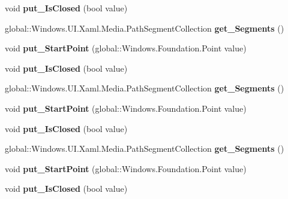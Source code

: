 \begin{DoxyCompactItemize}
void {\bfseries put\+\_\+\+Is\+Closed} (bool value)
\item 
\mbox{\label{interface_windows_1_1_u_i_1_1_xaml_1_1_media_1_1_i_path_figure_aaa95457239556a512efb7bb7df39b204}} 
global\+::\+Windows.\+U\+I.\+Xaml.\+Media.\+Path\+Segment\+Collection {\bfseries get\+\_\+\+Segments} ()
\item 
\mbox{\label{interface_windows_1_1_u_i_1_1_xaml_1_1_media_1_1_i_path_figure_a86e0b397f824468c4b41759cb0b0e209}} 
void {\bfseries put\+\_\+\+Start\+Point} (global\+::\+Windows.\+Foundation.\+Point value)
\item 
\mbox{\label{interface_windows_1_1_u_i_1_1_xaml_1_1_media_1_1_i_path_figure_a2a7fff536acc439d89e076c7b412848f}} 
void {\bfseries put\+\_\+\+Is\+Closed} (bool value)
\item 
\mbox{\label{interface_windows_1_1_u_i_1_1_xaml_1_1_media_1_1_i_path_figure_aaa95457239556a512efb7bb7df39b204}} 
global\+::\+Windows.\+U\+I.\+Xaml.\+Media.\+Path\+Segment\+Collection {\bfseries get\+\_\+\+Segments} ()
\item 
\mbox{\label{interface_windows_1_1_u_i_1_1_xaml_1_1_media_1_1_i_path_figure_a86e0b397f824468c4b41759cb0b0e209}} 
void {\bfseries put\+\_\+\+Start\+Point} (global\+::\+Windows.\+Foundation.\+Point value)
\item 
\mbox{\label{interface_windows_1_1_u_i_1_1_xaml_1_1_media_1_1_i_path_figure_a2a7fff536acc439d89e076c7b412848f}} 
void {\bfseries put\+\_\+\+Is\+Closed} (bool value)
\item 
\mbox{\label{interface_windows_1_1_u_i_1_1_xaml_1_1_media_1_1_i_path_figure_aaa95457239556a512efb7bb7df39b204}} 
global\+::\+Windows.\+U\+I.\+Xaml.\+Media.\+Path\+Segment\+Collection {\bfseries get\+\_\+\+Segments} ()
\item 
\mbox{\label{interface_windows_1_1_u_i_1_1_xaml_1_1_media_1_1_i_path_figure_a86e0b397f824468c4b41759cb0b0e209}} 
void {\bfseries put\+\_\+\+Start\+Point} (global\+::\+Windows.\+Foundation.\+Point value)
\item 
\mbox{\label{interface_windows_1_1_u_i_1_1_xaml_1_1_media_1_1_i_path_figure_a2a7fff536acc439d89e076c7b412848f}} 
void {\bfseries put\+\_\+\+Is\+Closed} (bool value)
\end{DoxyCompactItemize}


